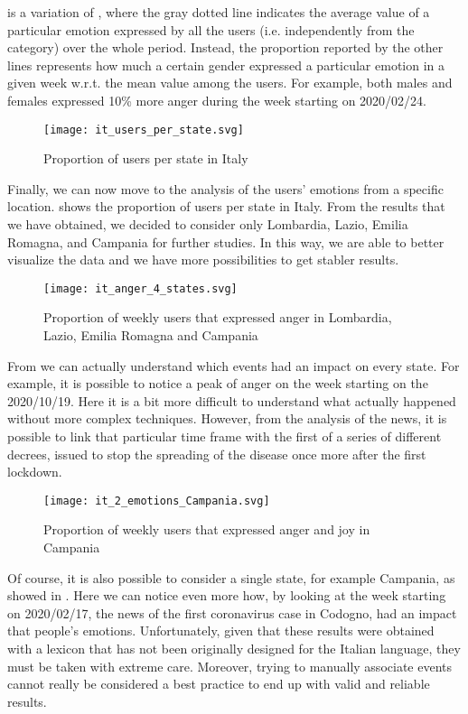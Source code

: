  is a variation of , where the gray dotted line indicates the average value of a particular emotion expressed by all the users (i.e. independently from the category) over the whole period. Instead, the proportion reported by the other lines represents how much a certain gender expressed a particular emotion in a given week w.r.t. the mean value among the users. For example, both males and females expressed 10\% more anger during the week starting on 2020/02/24.

\begin{figure}[H]
	\centering
    	\texttt{[image: it\_users\_per\_state.svg]}
    	\caption{Proportion of users per state in Italy}
    	\label{fig:it-users-state}
\end{figure}

Finally, we can now move to the analysis of the users' emotions from a specific location.  shows the proportion of users per state in Italy. From the results that we have obtained, we decided to consider only Lombardia, Lazio, Emilia Romagna, and Campania for further studies. In this way, we are able to better visualize the data and we have more possibilities to get stabler results. 

\begin{figure}[H]
	\centering
    	\texttt{[image: it\_anger\_4\_states.svg]}
    	\caption{Proportion of weekly users that expressed anger in Lombardia, Lazio, Emilia Romagna and Campania}
    	\label{fig:it-anger-4-states}
\end{figure}

From  we can actually understand which events had an impact on every state. For example, it is possible to notice a peak of anger on the week starting on the 2020/10/19. Here it is a bit more difficult to understand what actually happened without more complex techniques. However, from the analysis of the news, it is possible to link that particular time frame with the first of a series of different decrees, issued to stop the spreading of the disease once more after the first lockdown. 

\begin{figure}[H]
	\centering
    	\texttt{[image: it\_2\_emotions\_Campania.svg]}
    	\caption{Proportion of weekly users that expressed anger and joy in Campania}
    	\label{fig:it-2-emotions-campania}
\end{figure}

Of course, it is also possible to consider a single state, for example Campania, as showed in . Here we can notice even more how, by looking at the week starting on 2020/02/17, the news of the first coronavirus case in Codogno, had an impact that people's emotions. Unfortunately, given that these results were obtained with a lexicon that has not been originally designed for the Italian language, they must be taken with extreme care. Moreover, trying to manually associate events cannot really be considered a best practice to end up with valid and reliable results.